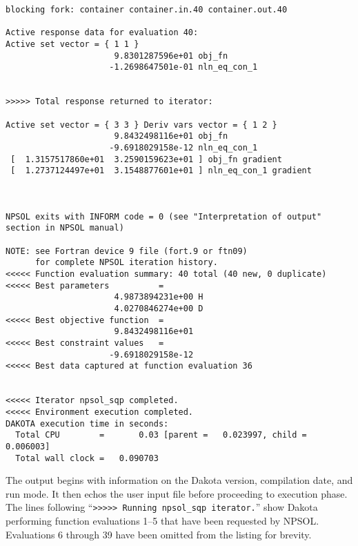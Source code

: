 \begin{small}
\begin{verbatim}
blocking fork: container container.in.40 container.out.40

Active response data for evaluation 40:
Active set vector = { 1 1 }
                      9.8301287596e+01 obj_fn
                     -1.2698647501e-01 nln_eq_con_1


>>>>> Total response returned to iterator:

Active set vector = { 3 3 } Deriv vars vector = { 1 2 }
                      9.8432498116e+01 obj_fn
                     -9.6918029158e-12 nln_eq_con_1
 [  1.3157517860e+01  3.2590159623e+01 ] obj_fn gradient
 [  1.2737124497e+01  3.1548877601e+01 ] nln_eq_con_1 gradient



NPSOL exits with INFORM code = 0 (see "Interpretation of output" section in NPSOL manual)

NOTE: see Fortran device 9 file (fort.9 or ftn09)
      for complete NPSOL iteration history.
<<<<< Function evaluation summary: 40 total (40 new, 0 duplicate)
<<<<< Best parameters          =
                      4.9873894231e+00 H
                      4.0270846274e+00 D
<<<<< Best objective function  =
                      9.8432498116e+01
<<<<< Best constraint values   =
                     -9.6918029158e-12
<<<<< Best data captured at function evaluation 36


<<<<< Iterator npsol_sqp completed.
<<<<< Environment execution completed.
DAKOTA execution time in seconds:
  Total CPU        =       0.03 [parent =   0.023997, child =   0.006003]
  Total wall clock =   0.090703
\end{verbatim}
\end{small}

The output begins with information on the Dakota version, compilation
date, and run mode.  It then echos the user input file before
proceeding to execution phase.  The lines following ``\texttt{>>>>>
  Running npsol\_sqp iterator.}''  show Dakota performing function
evaluations 1--5 that have been requested by NPSOL. Evaluations 6
through 39 have been omitted from the listing for brevity.

